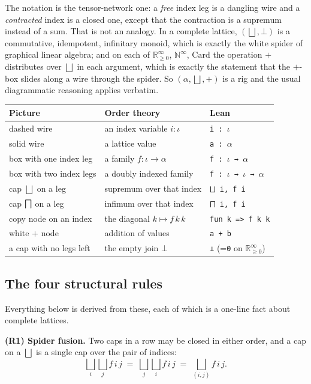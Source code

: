 \documentclass[11pt,a4paper]{article}
\providecommand{\bigsqcap}{}
\renewcommand{\bigsqcap}{\mathop{\rotatebox[origin=c]{180}{$\bigsqcup$}}}
\newcommand{\lean}[1]{\texttt{\small #1}}
\newcommand{\Rzi}{\mathbb{R}_{\geq 0}^{\infty}}
\newcommand{\Ninf}{\mathbb{N}^{\infty}}
\newcommand{\Card}{\mathrm{Card}}
\theoremstyle{definition}
\theoremstyle{plain}
\theoremstyle{remark}
\begin{document}
\medskip

The notation is the tensor-network one: a \emph{free} index leg is a dangling
wire and a \emph{contracted} index is a closed one, except that the
contraction is a supremum instead of a sum. That is not an analogy. In a
complete lattice, $(\bigsqcup,\bot)$ is a commutative, idempotent, infinitary
monoid, which is exactly the white spider of graphical linear algebra; and on
each of $\Rzi$, $\Ninf$, $\Card$ the operation $+$ distributes over
$\bigsqcup$ in each argument, which is exactly the statement that the
$+$-box slides along a wire through the spider. So $(\alpha,\bigsqcup,+)$ is a
rig and the usual diagrammatic reasoning applies verbatim.

\medskip
\begin{center}
\renewcommand{\arraystretch}{1.45}
\begin{tabular}{@{}lll@{}}
\toprule
\textbf{Picture} & \textbf{Order theory} & \textbf{Lean}\\
\midrule
dashed wire & an index variable $i:\iota$ & \lean{i : $\iota$}\\
solid wire & a lattice value & \lean{a : $\alpha$}\\
box with one index leg & a family $f:\iota\to\alpha$ & \lean{f : $\iota$ → $\alpha$}\\
box with two index legs & a doubly indexed family & \lean{f : $\iota$ → $\iota$ → $\alpha$}\\
cap $\bigsqcup$ on a leg & supremum over that index & \lean{⨆ i, f i}\\
cap $\bigsqcap$ on a leg & infimum over that index & \lean{⨅ i, f i}\\
copy node on an index & the diagonal $k\mapsto f\,k\,k$ & \lean{fun k => f k k}\\
white $+$ node & addition of values & \lean{a + b}\\
a cap with no legs left & the empty join $\bot$ & \lean{⊥} \;(=\;\lean{0} on $\Rzi$)\\
\bottomrule
\end{tabular}
\end{center}

\subsection{The four structural rules}

Everything below is derived from these, each of which is a one-line fact about
complete lattices.

\medskip
\noindent\textbf{(R1) Spider fusion.} Two caps in a row may be closed in either
order, and a cap on a $\bigsqcup$ is a single cap over the pair of indices:
\[
\bigsqcup_i \bigsqcup_j f\,i\,j \;=\; \bigsqcup_j \bigsqcup_i f\,i\,j
\;=\;\bigsqcup_{(i,j)} f\,i\,j .
\]
\end{document}

